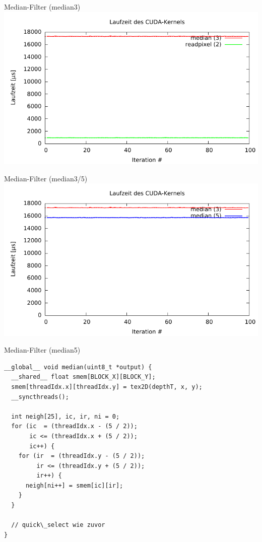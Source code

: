 \documentclass[compress]{beamer}
\begin{document}
\begin{frame}[fragile]{Median-Filter (median3)}
\includegraphics[width=\textwidth]{median3.pdf}
\end{frame}

\begin{frame}[fragile]{Median-Filter (median3/5)}
\includegraphics[width=\textwidth]{median35.pdf}
\end{frame}


\begin{frame}[fragile]{Median-Filter (median5)}
\begin{lstlisting}
__global__ void median(uint8_t *output) {
  __shared__ float smem[BLOCK_X][BLOCK_Y];
  smem[threadIdx.x][threadIdx.y] = tex2D(depthT, x, y);
  __syncthreads();

  int neigh[25], ic, ir, ni = 0;
  for (ic  = (threadIdx.x - (5 / 2));
       ic <= (threadIdx.x + (5 / 2));
       ic++) {
    for (ir  = (threadIdx.y - (5 / 2));
         ir <= (threadIdx.y + (5 / 2));
         ir++) {
      neigh[ni++] = smem[ic][ir];
    }
  }

  // quick\_select wie zuvor
}
\end{lstlisting}
\end{frame}
\end{document}
